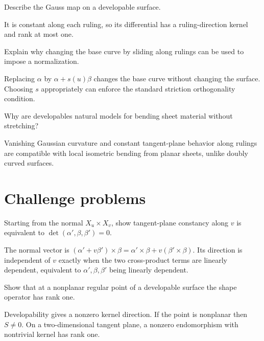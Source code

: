 \begin{problem}\label{prob:vii18-10}
Describe the Gauss map on a developable surface.
\end{problem}
\begin{solution}
It is constant along each ruling, so its differential has a ruling-direction kernel and rank at most one.
\end{solution}

\begin{problem}\label{prob:vii18-11}
Explain why changing the base curve by sliding along rulings can be used to impose a normalization.
\end{problem}
\begin{solution}
Replacing \(\alpha\) by \(\alpha+s(u)\beta\) changes the base curve without changing the surface. Choosing \(s\) appropriately can enforce the standard striction orthogonality condition.
\end{solution}

\begin{problem}\label{prob:vii18-12}
Why are developables natural models for bending sheet material without stretching?
\end{problem}
\begin{solution}
Vanishing Gaussian curvature and constant tangent-plane behavior along rulings are compatible with local isometric bending from planar sheets, unlike doubly curved surfaces.
\end{solution}

\section{Challenge problems}
\begin{problem}\label{prob:vii18-ch01}
Starting from the normal \(X_u\times X_v\), show tangent-plane constancy along \(v\) is equivalent to \(\det(\alpha',\beta,\beta')=0\).
\end{problem}
\begin{solution}
The normal vector is \((\alpha'+v\beta')\times\beta=\alpha'\times\beta+v(\beta'\times\beta)\). Its direction is independent of \(v\) exactly when the two cross-product terms are linearly dependent, equivalent to \(\alpha',\beta,\beta'\) being linearly dependent.
\end{solution}

\begin{problem}\label{prob:vii18-ch02}
Show that at a nonplanar regular point of a developable surface the shape operator has rank one.
\end{problem}
\begin{solution}
Developability gives a nonzero kernel direction. If the point is nonplanar then \(S\neq0\). On a two-dimensional tangent plane, a nonzero endomorphism with nontrivial kernel has rank one.
\end{solution}


